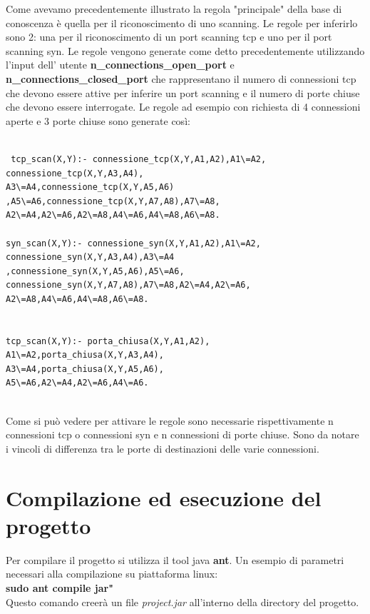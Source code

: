 \documentclass[a4paper,12pt]{article} %
\begin{document}
Come avevamo precedentemente illustrato la regola "principale" della base di conoscenza è quella per il riconoscimento
di uno scanning. Le regole per inferirlo sono 2: una per il riconoscimento di un port scanning tcp e uno per il port scanning
syn. Le regole vengono generate come detto precedentemente utilizzando l'input dell' utente \textbf{n\_connections\_open\_port} e \textbf{n\_connections\_closed\_port} che rappresentano il numero di connessioni tcp che devono essere attive per inferire un port scanning e il numero di porte chiuse che devono essere interrogate.
Le regole ad esempio con richiesta di 4 connessioni aperte e 3 porte chiuse sono generate così:\\


\begin{lstlisting}

 tcp_scan(X,Y):- connessione_tcp(X,Y,A1,A2),A1\=A2,
connessione_tcp(X,Y,A3,A4),
A3\=A4,connessione_tcp(X,Y,A5,A6)
,A5\=A6,connessione_tcp(X,Y,A7,A8),A7\=A8,
A2\=A4,A2\=A6,A2\=A8,A4\=A6,A4\=A8,A6\=A8.

syn_scan(X,Y):- connessione_syn(X,Y,A1,A2),A1\=A2,
connessione_syn(X,Y,A3,A4),A3\=A4
,connessione_syn(X,Y,A5,A6),A5\=A6,
connessione_syn(X,Y,A7,A8),A7\=A8,A2\=A4,A2\=A6,
A2\=A8,A4\=A6,A4\=A8,A6\=A8.
 

tcp_scan(X,Y):- porta_chiusa(X,Y,A1,A2),
A1\=A2,porta_chiusa(X,Y,A3,A4),
A3\=A4,porta_chiusa(X,Y,A5,A6),
A5\=A6,A2\=A4,A2\=A6,A4\=A6.


\end{lstlisting}



Come si può vedere per attivare le regole sono necessarie rispettivamente n connessioni tcp o connessioni syn e n
connessioni di porte chiuse. Sono da notare i vincoli di differenza tra le porte di destinazioni delle varie connessioni.




\section{Compilazione ed esecuzione del progetto}

Per compilare il progetto si utilizza il tool java \textbf{ant}. Un esempio 
di parametri necessari alla compilazione su piattaforma linux:\\

\textbf{sudo ant compile jar"}\\

Questo comando creerà un file \emph{project.jar} all'interno della directory del progetto.\\
\end{document}
